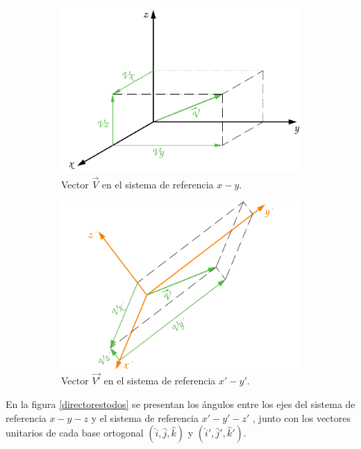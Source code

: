 \documentclass[12pt,letterpaper, twoside, openany]{article}
\begin{document}
\begin{figure}[H]
\begin{subfigure}[l]{0.450\textwidth}
		\includegraphics[width=\textwidth]{img/Vector1Componentes3D.pdf}
		\caption{Vector $\overset{\rightarrow}{V}$ en el sistema de referencia $x-y$.}
		\label{vector1comp3d}
	\end{subfigure}
	\hspace{.5 cm}
	\begin{subfigure}[r]{0.450\textwidth}
		\includegraphics[width=\textwidth]{img/Vector2Componentes3D.pdf}
		\caption{Vector $\overset{\rightarrow}{V'}$ en el sistema de referencia $x'-y'$.}
		\label{vector2comp3d}
	\end{subfigure}	
	\caption{}
	\label{directores}
\end{figure}
%
%
%
%
%
En la figura \ref{directorestodos} se presentan los ángulos entre los ejes del sistema de referencia $x-y-z$ y el sistema de referencia $x'-y'-z'$ , junto con los vectores unitarios de cada base ortogonal $\left( \hat{i}, \hat{j}, \hat{k} \right)$ y $\left( \hat{i}', \hat{j}', \hat{k}' \right)$.\\\\
\end{document}
